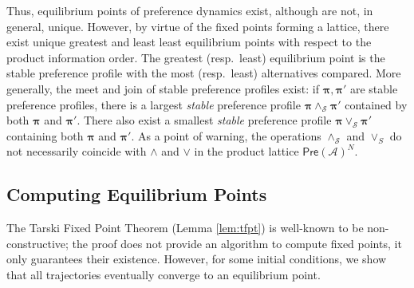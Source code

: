 \documentclass[conference]{ieeeconf}
\newcommand{\A}{\mathcal{A}}
\renewcommand{\P}{\mathcal{P}}
\renewcommand{\S}{\mathcal{S}}
\newcommand{\Pref}{\mathsf{Pre}}
\renewcommand{\L}{\mathcal{L}}
\newcommand{\profile}{\boldsymbol{\pi}}
\newcommand{\join}{\vee}
\newcommand{\meet}{\wedge}
\renewcommand{\leq}{\leqslant}
\newtheorem{definition}{Definition}
\begin{document}
Thus, equilibrium points of preference dynamics exist, although are not, in general, unique. However, by virtue of the fixed points forming a lattice, there exist unique greatest and least least equilibrium points with respect to the product information order. The greatest (resp.~least) equilibrium point is the stable preference profile with the most (resp.~least) alternatives compared. More generally, the meet and join of stable preference profiles exist: if $\profile, \profile'$ are stable preference profiles, there is a largest \emph{stable} preference profile $\profile \meet_{\S} \profile'$ contained by both $\profile$ and $\profile'$. There also exist a smallest \emph{stable} preference profile $\profile \join_{\S} \profile'$ containing both $\profile$ and $\profile'$. As a point of warning, the operations $\meet_\S$ and $\join_S$ do not necessarily coincide with $\meet$ and $\join$ in the product lattice $\Pref(\A)^N$.



\subsection{Computing Equilibrium Points}



The Tarski Fixed Point Theorem (Lemma \ref{lem:tfpt}) is well-known to be non-constructive; the proof does not provide an algorithm to compute fixed points, it only guarantees their existence. However, for some initial conditions, we show that all trajectories eventually converge to an equilibrium point.



\end{document}
